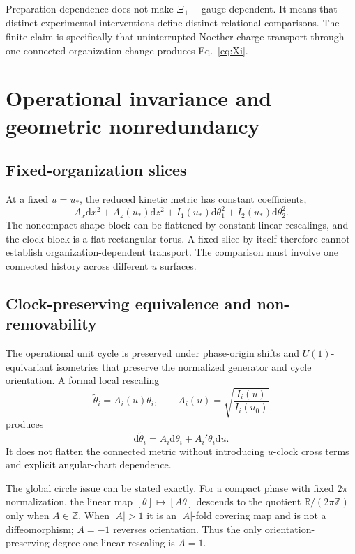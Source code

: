 \documentclass[11pt]{article}
\theoremstyle{plain}
\newcommand{\dd}{\mathrm d}
\newcommand{\R}{\mathbb R}
\begin{document}
Preparation dependence does not make $\Xi_{+-}$ gauge dependent. It means that distinct experimental interventions define distinct relational comparisons. The finite claim is specifically that uninterrupted Noether-charge transport through one connected organization change produces Eq.~\eqref{eq:Xi}.

\section{Operational invariance and geometric nonredundancy}
\label{sec:invariance}

\subsection{Fixed-organization slices}

At a fixed $u=u_*$, the reduced kinetic metric has constant coefficients,
\begin{equation}
A_x\dd x^2+A_z(u_*)\dd z^2+I_1(u_*)\dd\theta_1^2+I_2(u_*)\dd\theta_2^2.
\end{equation}
The noncompact shape block can be flattened by constant linear rescalings, and the clock block is a flat rectangular torus. A fixed slice by itself therefore cannot establish organization-dependent transport. The comparison must involve one connected history across different $u$ surfaces.

\subsection{Clock-preserving equivalence and non-removability}

The operational unit cycle is preserved under phase-origin shifts and $U(1)$-equivariant isometries that preserve the normalized generator and cycle orientation. A formal local rescaling
\begin{equation}
\widetilde\theta_i=A_i(u)\theta_i,\qquad A_i(u)=\sqrt{\frac{I_i(u)}{I_i(u_0)}}
\end{equation}
produces
\begin{equation}
\dd\widetilde\theta_i=A_i\dd\theta_i+A_i'\theta_i\dd u.
\end{equation}
It does not flatten the connected metric without introducing $u$-clock cross terms and explicit angular-chart dependence.

The global circle issue can be stated exactly. For a compact phase with fixed $2\pi$ normalization, the linear map $[\theta]\mapsto[A\theta]$ descends to the quotient $\R/(2\pi\mathbb Z)$ only when $A\in\mathbb Z$. When $|A|>1$ it is an $|A|$-fold covering map and is not a diffeomorphism; $A=-1$ reverses orientation. Thus the only orientation-preserving degree-one linear rescaling is $A=1$.
\end{document}

